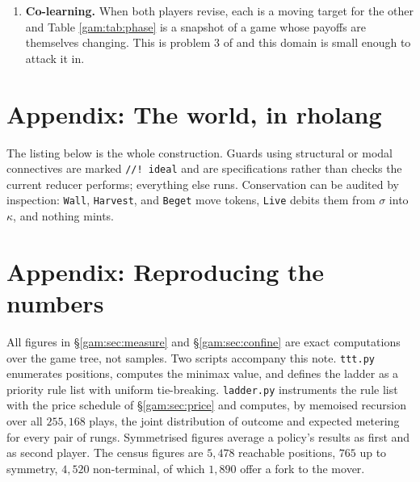 \begin{enumerate}
\item \textbf{Co-learning.} When both players revise, each is a moving target
for the other and Table \ref{gam:tab:phase} is a snapshot of a game whose payoffs
are themselves changing. This is problem 3 of \chSci and this domain
is small enough to attack it in.
\end{enumerate}


\section{Appendix: The world, in rholang}\label{gam:app:code}\label{gam:S13}

The listing below is the whole construction. Guards using structural or modal
connectives are marked \texttt{//!\ ideal} and are specifications rather than
checks the current reducer performs; everything else runs. Conservation can be
audited by inspection: \texttt{Wall}, \texttt{Harvest}, and \texttt{Beget} move
tokens, \texttt{Live} debits them from $\sigma$ into $\kappa$, and nothing
mints.



\section{Appendix: Reproducing the numbers}\label{gam:app:repro}\label{gam:S14}

All figures in \S\ref{gam:sec:measure} and \S\ref{gam:sec:confine} are exact
computations over the game tree, not samples. Two scripts accompany this note.
\texttt{ttt.py} enumerates positions, computes the minimax value, and defines
the ladder as a priority rule list with uniform tie-breaking.
\texttt{ladder.py} instruments the rule list with the price schedule of
\S\ref{gam:sec:price} and computes, by memoised recursion over all $255{,}168$
plays, the joint distribution of outcome and expected metering for every pair of
rungs. Symmetrised figures average a policy's results as first and as second
player. The census figures are $5{,}478$ reachable positions, $765$ up to
symmetry, $4{,}520$ non-terminal, of which $1{,}890$ offer a fork to the mover.

